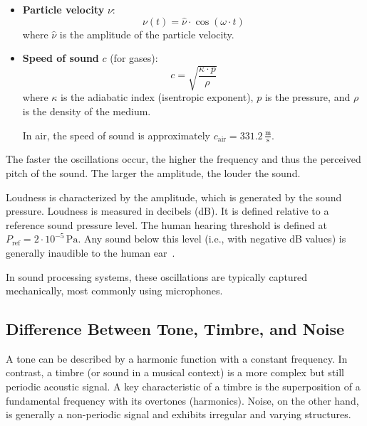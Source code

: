 \begin{itemize}
	\item \textbf{Particle velocity} \( \nu \):
	\begin{equation}
		\nu(t) = \hat{\nu} \cdot \cos(\omega \cdot t)
		\label{eq:schallschnelle}
	\end{equation}
	where \( \hat{\nu} \) is the amplitude of the particle velocity.
	
	\item \textbf{Speed of sound} \( c \) (for gases):
	\begin{equation}
		c = \sqrt{\frac{\kappa \cdot p}{\rho}}
		\label{eq:schallgeschwindigkeit}
	\end{equation}
	where \( \kappa \) is the adiabatic index (isentropic exponent), \( p \) is the pressure, and \( \rho \) is the density of the medium.
	
	\medskip
	
	In air, the speed of sound is approximately \( c_{\text{air}} = 331.2\,\frac{\text{m}}{\text{s}} \).
\end{itemize}

The faster the oscillations occur, the higher the frequency and thus the perceived pitch of the sound. The larger the amplitude, the louder the sound.

Loudness is characterized by the amplitude, which is generated by the sound pressure. Loudness is measured in decibels (dB). It is defined relative to a reference sound pressure level. The human hearing threshold is defined at \( P_{\text{ref}} = 2 \cdot 10^{-5}\,\text{Pa} \). Any sound below this level (i.e., with negative dB values) is generally inaudible to the human ear~\cite{Luders:2017}.

In sound processing systems, these oscillations are typically captured mechanically, most commonly using microphones.

\subsection{Difference Between Tone, Timbre, and Noise}

A tone can be described by a harmonic function with a constant frequency. \cite{Rossing:2002} 
In contrast, a timbre (or sound in a musical context) is a more complex but still periodic acoustic signal.  
A key characteristic of a timbre is the superposition of a fundamental frequency with its overtones (harmonics). \cite{Zwicker:1999}
Noise, on the other hand, is generally a non-periodic signal and exhibits irregular and varying structures. \cite{Smith:2007}

